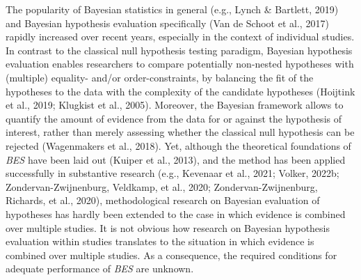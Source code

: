 \documentclass[
]{interact}
\begin{document}
The popularity of Bayesian statistics in general (e.g., Lynch \&
Bartlett, 2019) and Bayesian hypothesis evaluation specifically (Van de
Schoot et al., 2017) rapidly increased over recent years, especially in
the context of individual studies. In contrast to the classical null
hypothesis testing paradigm, Bayesian hypothesis evaluation enables
researchers to compare potentially non-nested hypotheses with (multiple)
equality- and/or order-constraints, by balancing the fit of the
hypotheses to the data with the complexity of the candidate hypotheses
(Hoijtink et al., 2019; Klugkist et al., 2005). Moreover, the Bayesian
framework allows to quantify the amount of evidence from the data for or
against the hypothesis of interest, rather than merely assessing whether
the classical null hypothesis can be rejected (Wagenmakers et al.,
2018). Yet, although the theoretical foundations of \emph{BES} have been
laid out (Kuiper et al., 2013), and the method has been applied
successfully in substantive research (e.g., Kevenaar et al., 2021;
Volker, 2022b; Zondervan-Zwijnenburg, Veldkamp, et al., 2020;
Zondervan-Zwijnenburg, Richards, et al., 2020), methodological research
on Bayesian evaluation of hypotheses has hardly been extended to the
case in which evidence is combined over multiple studies. It is not
obvious how research on Bayesian hypothesis evaluation within studies
translates to the situation in which evidence is combined over multiple
studies. As a consequence, the required conditions for adequate
performance of \emph{BES} are unknown.
\end{document}
